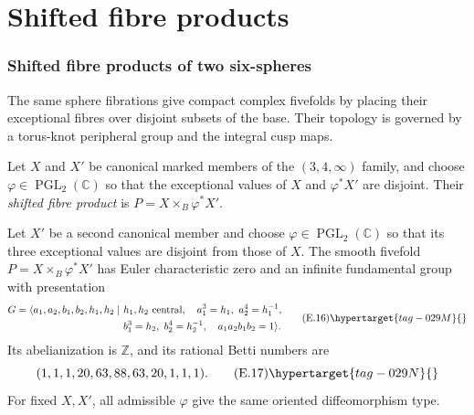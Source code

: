\part{Shifted fibre products}
\section{Shifted fibre products of two six-spheres}\label{sec:shifted}

The same sphere fibrations give compact complex fivefolds by placing
their exceptional fibres over disjoint subsets of the base. Their topology
is governed by a torus-knot peripheral group and the integral cusp maps.

\begin{definition}\label{def:V:shifted-product}
Let $X$ and $X'$ be canonical marked members of the $(3,4,\infty)$
family, and choose $\varphi\in\operatorname{PGL}_2(\mathbb C)$ so that
the exceptional values of $X$ and $\varphi^*X'$ are disjoint.
Their \emph{shifted fibre product} is $P=X\times_B\varphi^*X'$.
\end{definition}

\begin{theorem}\hypertarget{tag-02MN}{}\label{maps:src:E.2.3}


Let $X'$ be a second canonical member and choose $\varphi\in
\operatorname{PGL}_2(\mathbb C)$ so that its three exceptional
values are disjoint from those of $X$.  The smooth fivefold
$P=X\times_B\varphi^*X'$ has Euler characteristic zero and
an infinite fundamental group with presentation
\[
\begin{split}
G=\langle a_1,a_2,b_1,b_2,h_1,h_2\mid\ &
 h_1,h_2\ \text{central},\quad
 a_1^3=h_1,\ a_2^4=h_1^{-1},\\
 &b_1^3=h_2,\ b_2^4=h_2^{-1},\quad
 a_1a_2b_1b_2=1\rangle .
\end{split}
\tag{E.16}\hypertarget{tag-029M}{}\label{maps:eq:E.16}
\]
Its abelianization is $\mathbb Z$, and its rational Betti numbers are
\[
 (1,1,1,20,63,88,63,20,1,1,1).
 \tag{E.17}\hypertarget{tag-029N}{}\label{maps:eq:E.17}
\]
For fixed $X,X'$, all admissible $\varphi$ give the same oriented
diffeomorphism type.

\end{theorem}


